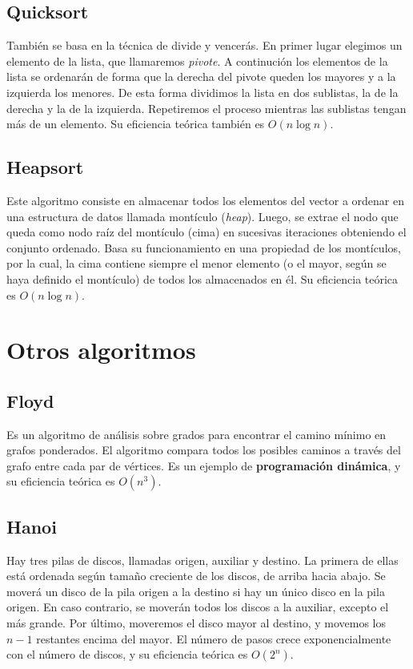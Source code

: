 \documentclass[11pt]{article}
\begin{document}
\subsection*{Quicksort}
También se basa en la técnica de divide y vencerás.
En primer lugar elegimos un elemento de la lista, que llamaremos \textit{pivote}. A continución los elementos de la lista se ordenarán de forma que la derecha del pivote queden los mayores y a la izquierda los menores. De esta forma dividimos la lista en dos sublistas, la de la derecha y la de la izquierda. Repetiremos el proceso mientras las sublistas tengan más de un elemento. Su eficiencia teórica también es $O(n\log n)$.

\subsection*{Heapsort}
Este algoritmo consiste en almacenar todos los elementos del vector a ordenar en una estructura de datos llamada montículo (\textit{heap}). Luego, se extrae el nodo que queda como nodo raíz del montículo (cima) en sucesivas iteraciones obteniendo el conjunto ordenado. Basa su funcionamiento en una propiedad de los montículos, por la cual, la cima contiene siempre el menor elemento (o el mayor, según se haya definido el montículo) de todos los almacenados en él. Su eficiencia teórica es $O(n\log n)$.

\section*{Otros algoritmos}

\subsection*{Floyd}
Es un algoritmo de análisis sobre grados para encontrar el camino mínimo en grafos ponderados. El algoritmo compara todos los posibles caminos a través del grafo entre cada par de vértices. Es un ejemplo de \textbf{programación dinámica}, y su eficiencia teórica es $O(n^3)$.

\subsection*{Hanoi}
Hay tres pilas de discos, llamadas origen, auxiliar y destino. La primera de ellas está ordenada según tamaño creciente de los discos, de arriba hacia abajo. Se moverá un disco de la pila origen a la destino si hay un único disco en la pila origen. En caso contrario, se moverán todos los discos a la auxiliar, excepto el más grande. Por último, moveremos el disco mayor al destino, y movemos los $n-1$ restantes encima del mayor. El número de pasos crece exponencialmente con el número de discos, y su eficiencia teórica es $O(2^n)$.
\end{document}
